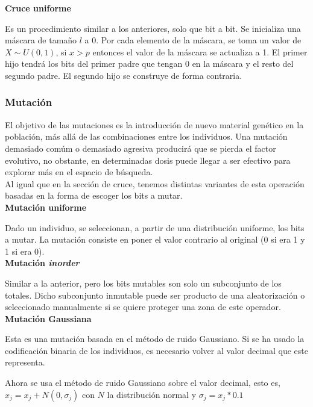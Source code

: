 \documentclass[12pt,a4paper]{article}
\begin{document}
			\textbf{Cruce uniforme}
			
			Es un procedimiento similar a los anteriores, solo que bit a bit. Se inicializa una m\'ascara de tama\~no $l$ a 0. Por cada elemento de la m\'ascara, se toma un valor de $X \sim U(0,1)$, si $x > p$ entonces el valor de la m\'ascara se actualiza a 1. El primer hijo tendr\'a los bits del primer padre que tengan 0 en la m\'ascara y el resto del segundo padre. El segundo hijo se construye de forma contraria. 
			
			
			\subsubsection{Mutaci\'on}

			El objetivo de las mutaciones es la introducci\'on de nuevo material gen\'etico en la poblaci\'on, m\'as all\'a de las combinaciones entre los individuos. Una mutaci\'on demasiado com\'um o demasiado agresiva producir\'a que se pierda el factor evolutivo, no obstante, en determinadas dosis puede llegar a ser efectivo para explorar m\'as en el espacio de b\'usqueda.\\
			
			Al igual que en la secci\'on de cruce, tenemos distintas variantes de esta operaci\'on basadas en la forma de escoger los bits a mutar.\\
			
			\textbf{Mutaci\'on uniforme}

			Dado un individuo, se seleccionan, a partir de una distribuci\'on uniforme, los bits a mutar. La mutaci\'on consiste en poner el valor contrario al original (0 si era 1 y 1 si era 0).\\			
		
		
			\textbf{Mutaci\'on \textit{inorder}}
		
			Similar a la anterior, pero los bits mutables son solo un subconjunto de los totales. Dicho subconjunto inmutable puede ser producto de una aleatorizaci\'on o seleccionado manualmente si se quiere proteger una zona de este operador.\\
			

			\textbf{Mutaci\'on Gaussiana}

			Esta es una mutaci\'on basada en el m\'etodo de ruido Gaussiano. Si se ha usado la codificaci\'on binaria de los individuos, es necesario volver al valor decimal que este representa. 
			
			Ahora se usa el m\'etodo de ruido Gaussiano sobre el valor decimal, esto es, $x_j = x_j + N(0,\sigma_j)$ con $N$ la distribuci\'on normal y $\sigma_j = x_j * 0.1$
			
\end{document}
